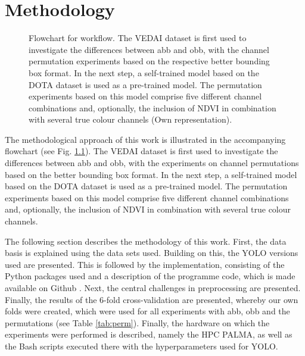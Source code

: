 \chapter{Methodology}
\label{ch:methodology}
\begin{figure}[htbp]
    \centering
    
    \caption[Flowchart for workflow]{Flowchart for workflow. The VEDAI dataset is first used to investigate the differences between \acrshort{abb} and \acrshort{obb}, with the channel permutation experiments based on the respective better bounding box format. In the next step, a self-trained model based on the DOTA dataset is used as a pre-trained model. The permutation experiments based on this model comprise five different channel combinations and, optionally, the inclusion of NDVI in combination with several true colour channels (Own representation).}
    \label{fig:Flowchart}
\end{figure}

The methodological approach of this work is illustrated in the accompanying flowchart (see Fig. \ref{fig:Flowchart}). The \acrshort{VEDAI} dataset is first used to investigate the differences between \acrshort{abb} and \acrshort{obb}, with the experiments on channel permutations based on the better bounding box format. In the next step, a self-trained model based on the DOTA dataset is used as a pre-trained model. The permutation experiments based on this model comprise five different channel combinations and, optionally, the inclusion of NDVI in combination with several true colour channels.

The following section describes the methodology of this work. First, the data basis is explained using the data sets used. Building on this, the \acrshort{YOLO} versions used are presented. This is followed by the implementation, consisting of the Python packages used and a description of the programme code, which is made available on Github \cite{Github_timo}. Next, the central challenges in preprocessing are presented. Finally, the results of the 6-fold cross-validation are presented, whereby our own folds were created, which were used for all experiments with \acrshort{abb}, \acrshort{obb} and the permutations (see Table \ref{tab:perm}). Finally, the hardware on which the experiments were performed is described, namely the \acrlong{HPC} \acrshort{PALMA}, as well as the Bash scripts executed there with the hyperparameters used for \acrshort{YOLO}. 



